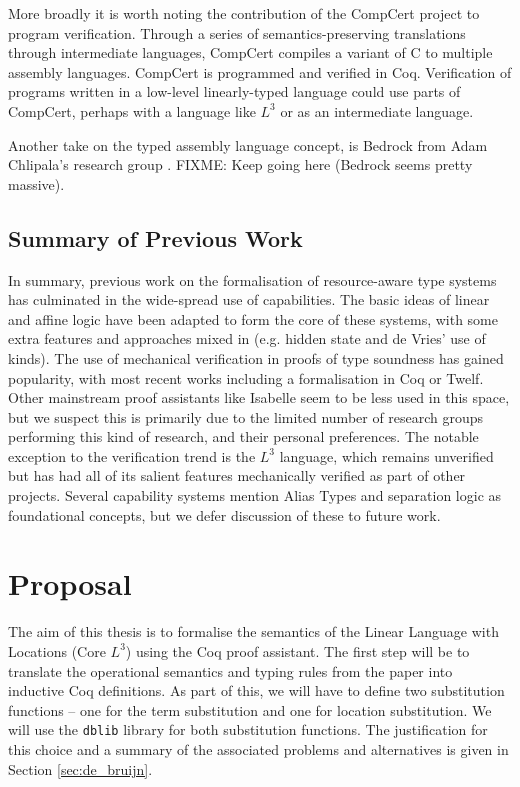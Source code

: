 \documentclass[]{unswthesis}
\newcommand{\SSPHS}{\text{SSPHS }}
\begin{document}
More broadly it is worth noting the contribution of the CompCert \cite{leroy09} project to program verification. Through a series of semantics-preserving translations through intermediate languages, CompCert compiles a variant of C to multiple assembly languages. CompCert is programmed and verified in Coq. Verification of programs written in a low-level linearly-typed language could use parts of CompCert, perhaps with a language like $L^3$ or \SSPHS as an intermediate language.

Another take on the typed assembly language concept, is Bedrock from Adam Chlipala's research group \cite{chlipala11}. FIXME: Keep going here (Bedrock seems pretty massive).


\section{Summary of Previous Work}

In summary, previous work on the formalisation of resource-aware type systems has culminated in the wide-spread use of capabilities. The basic ideas of linear and affine logic have been adapted to form the core of these systems, with some extra features and approaches mixed in (e.g. hidden state and de Vries' use of kinds). The use of mechanical verification in proofs of type soundness has gained popularity, with most recent works including a formalisation in Coq or Twelf. Other mainstream proof assistants like Isabelle seem to be less used in this space, but we suspect this is primarily due to the limited number of research groups performing this kind of research, and their personal preferences. The notable exception to the verification trend is the $L^3$ language, which remains unverified but has had all of its salient features mechanically verified as part of other projects. Several capability systems mention Alias Types \cite{smith00} and separation logic \cite{reynolds02} as foundational concepts, but we defer discussion of these to future work.

\chapter{Proposal}
\label{ch:proposal}

The aim of this thesis is to formalise the semantics of the Linear Language with Locations (Core $L^3$) using the Coq proof assistant. The first step will be to translate the operational semantics and typing rules from the paper \cite{ahmed05} into inductive Coq definitions. As part of this, we will have to define two substitution functions -- one for the term substitution and one for location substitution. We will use the \texttt{dblib} library \cite{dblib13} for both substitution functions. The justification for this choice and a summary of the associated problems and alternatives is given in Section \ref{sec:de_bruijn}.
\end{document}
